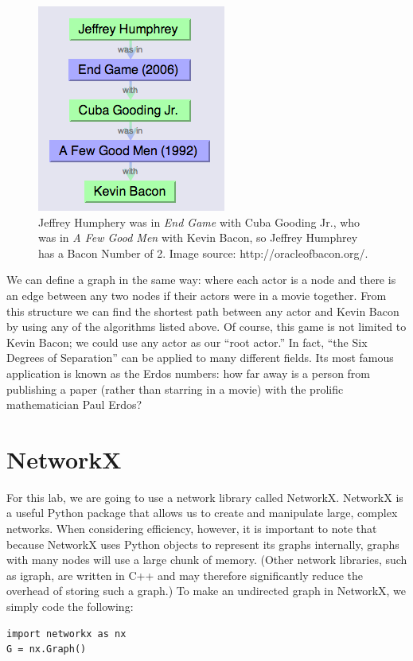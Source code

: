 \begin{figure}
\includegraphics[scale = .6]{Example}
\caption{Jeffrey Humphery was in \emph{End Game} with Cuba Gooding Jr., who was in \emph{A Few Good Men} with Kevin Bacon, so Jeffrey Humphrey has a Bacon Number of 2.  Image source: http://oracleofbacon.org/.}
\end{figure}

We can define a graph in the same way: where each actor is a node and there is an edge between any two nodes if their actors were in a movie together. From this structure we can find
the shortest path between any actor and Kevin Bacon by using any of the algorithms listed above. Of course, this game is not limited to Kevin Bacon; we could use any actor as our ``root actor.''
In fact, ``the Six Degrees of Separation'' can be applied to many different fields. Its most famous application is known as the Erdos numbers: how far away is a person
 from publishing a paper (rather than starring in a movie) with the prolific mathematician Paul Erdos?

\section*{NetworkX}
For this lab, we are going to use a network library called NetworkX. NetworkX is a useful Python package that allows us to create and manipulate large, complex networks.
When considering efficiency, however, it is important to note that because NetworkX uses Python objects to represent its graphs internally, graphs with many nodes will
use a large chunk of memory. (Other network libraries, such as igraph, are written in C++ and may therefore significantly reduce the overhead of storing such a graph.)
To make an undirected graph in NetworkX, we simply code the following:

\begin{lstlisting}
import networkx as nx
G = nx.Graph()
\end{lstlisting}


